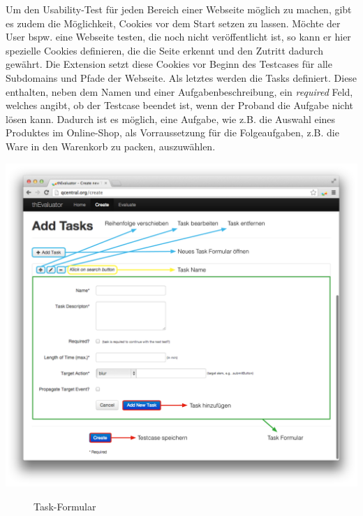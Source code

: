 Um den Usability-Test für jeden Bereich einer Webseite möglich zu machen, gibt es zudem die Möglichkeit, Cookies vor dem Start setzen zu lassen. Möchte der User bspw. eine Webseite testen, die noch nicht veröffentlicht ist, so kann er hier spezielle Cookies definieren, die die Seite erkennt und den Zutritt dadurch gewährt. Die Extension setzt diese Cookies vor Beginn des Testcases für alle Subdomains und Pfade der Webseite. Als letztes werden die Tasks definiert. Diese enthalten, neben dem Namen und einer Aufgabenbeschreibung, ein \textit{required} Feld, welches angibt, ob der Testcase beendet ist, wenn der Proband die Aufgabe nicht lösen kann. Dadurch ist es möglich, eine Aufgabe, wie z.B. die Auswahl eines Produktes im Online-Shop, als Vorraussetzung für die Folgeaufgaben, z.B. die Ware in den Warenkorb zu packen, auszuwählen.

\begin{center}
\includegraphics[scale=0.4]{./images/taskscreen}
\end{center}
\begin{figure}[htb]
   \centering
   \caption{Task-Formular}
    \label{taskscreen}
\end{figure}

